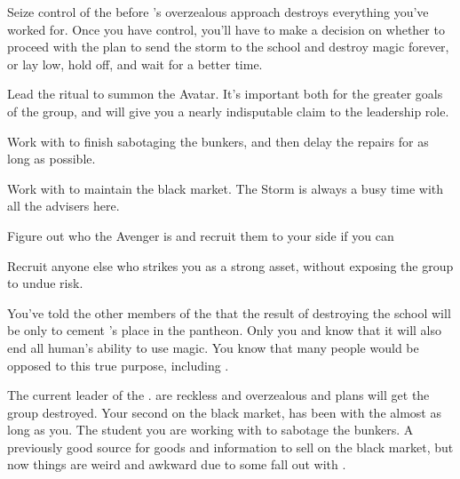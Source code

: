 \documentclass[char]{GL2020}
\begin{document}
\begin{itemz}[Goals]
	\item Seize control of the \pGoaties{} before \cChupLeader{}’s overzealous approach destroys everything you’ve worked for. Once you have control, you’ll have to make a decision on whether to proceed with the plan to send the storm to the school and destroy magic forever, or lay low, hold off, and wait for a better time.
	\item Lead the ritual to summon the \cGenesis{} Avatar. It’s important both for the greater goals of the group, and will give you a nearly indisputable claim to the leadership role.
	\item Work with \cChupStudent{} to finish sabotaging the bunkers, and then delay the repairs for as long as possible.
	\item Work with \cChupInventor{} to maintain the black market. The Storm is always a busy time with all the advisers here.
	\item Figure out who the Avenger is and recruit them to your side if you can 
\item Recruit anyone else who strikes you as a strong asset, without exposing the group to undue risk.
\end{itemz}

\begin{itemz}[Notes]
	\item You’ve told the other members of the \pGoaties{} that the result of destroying the school will be only to cement \cGenesis{}’s place in the pantheon. Only you and \cChupLeader{} know that it will also end all human’s ability to use magic. You know that many people would be opposed to this true purpose, including \cChupInventor{}.
\end{itemz}

\begin{contacts}
	\contact{\cChupLeader{}} The current leader of the \pGoaties{}. \cChupLeader{\They} are reckless and overzealous and \cChupLeader{\their} plans will get the group destroyed.
	\contact{\cChupInventor{}} Your second on the black market, \cChupInventor{} has been with the \pGoaties{} almost as long as you.
	\contact{\cChupStudent{}} The student you are working with to sabotage the bunkers.
	\contact{\cEthics{}} A previously good source for goods and information to sell on the black market, but now things are weird and awkward due to some fall out with \cLibrarian{}.
\end{contacts}
\end{document}
